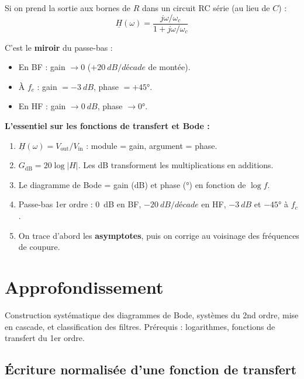 \documentclass[12pt,a4paper,twoside]{book}
\begin{document}
Si on prend la sortie aux bornes de $R$ dans un circuit RC série (au lieu de $C$) :
\[
\underline{H}(\omega) = \frac{j\omega/\omega_c}{1 + j\omega/\omega_c}
\]

C'est le \textbf{miroir} du passe-bas :
\begin{itemize}[nosep]
\item En BF : gain $\to 0$ ($+\SI{20}{dB/décade}$ de montée).
\item À $f_c$ : gain $= \SI{-3}{dB}$, phase $= +45°$.
\item En HF : gain $\to \SI{0}{dB}$, phase $\to 0°$.
\end{itemize}

\begin{retenir}
\textbf{L'essentiel sur les fonctions de transfert et Bode :}
\begin{enumerate}[nosep]
\item $\underline{H}(\omega) = V_{\text{out}}/V_{\text{in}}$ : module = gain, argument = phase.
\item $G_{\text{dB}} = 20\log|H|$. Les dB transforment les multiplications en additions.
\item Le diagramme de Bode = gain (dB) et phase (°) en fonction de $\log f$.
\item Passe-bas 1er ordre : \SI{0}{dB} en BF, $-\SI{20}{dB/décade}$ en HF, $-\SI{3}{dB}$ et $-45°$ à $f_c$.
\item On trace d'abord les \textbf{asymptotes}, puis on corrige au voisinage des fréquences de coupure.
\end{enumerate}
\end{retenir}

\section{Approfondissement}

\begin{approfondissement}
Construction systématique des diagrammes de Bode, systèmes du 2nd ordre, mise en cascade, et classification des filtres. Prérequis : logarithmes, fonctions de transfert du 1er ordre.
\end{approfondissement}

\subsection{Écriture normalisée d'une fonction de transfert}
\end{document}
